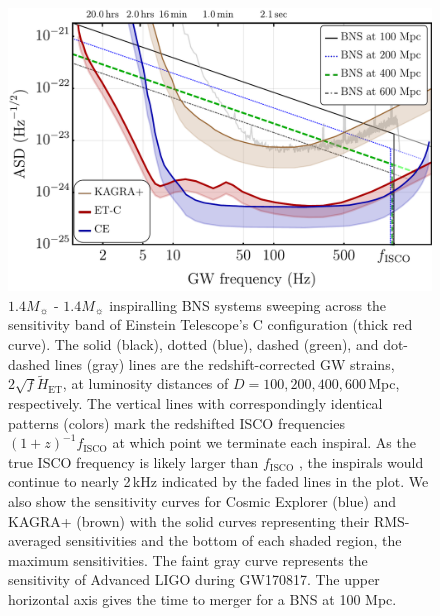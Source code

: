 \documentclass{aa}
\begin{document}
\begin{figure}
\sidecaption
\includegraphics[width=12cm]{../Figs/ET_strains_redshifted_v4.pdf}
\caption{%
$1.4 M_\sun$ - $1.4 M_\sun$ inspiralling BNS systems sweeping across the sensitivity band of Einstein Telescope's C configuration (thick red curve).
The solid (black), dotted (blue), dashed (green), and dot-dashed lines (gray) lines are the redshift-corrected GW strains, $2\sqrt{f}\tilde{H}_\text{ET}$, at luminosity distances of $D=100, 200, 400, 600\,$Mpc, respectively. 
The vertical lines with correspondingly identical patterns (colors) mark the redshifted ISCO frequencies $(1+z)^{-1} f_\text{ISCO}$ at which point we terminate each inspiral.
As the true ISCO frequency is likely larger than $f_\text{ISCO}$ \citep{Marronetti:2003hx}, the inspirals would continue to nearly 2\,kHz indicated by the faded lines in the plot.
We also show the sensitivity curves for Cosmic Explorer (blue) and KAGRA+ (brown) with the solid curves representing their RMS-averaged sensitivities and the bottom of each shaded region, the maximum sensitivities.
The faint gray curve represents the sensitivity of Advanced LIGO during GW170817.
The upper  horizontal axis gives the time to merger for a BNS at 100 Mpc.
}
\label{fig:ETB2030}
\end{figure}
%
%
%
\end{document}
